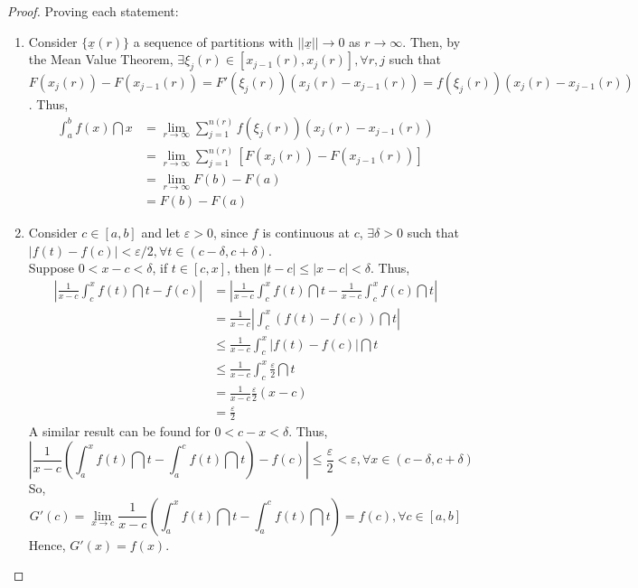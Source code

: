 \begin{proof}
    Proving each statement:
    \begin{enumerate}
        \item Consider $\{\underline{x}(r)\}$ a sequence of partitions with $||\underline{x}|| \to 0$ as $r \to \infty$. Then, by the Mean Value Theorem, $\exists \xi_j(r) \in [x_{j-1}(r), x_j(r)], \forall r, j$ such that $F(x_j(r)) - F(x_{j-1}(r)) = F'(\xi_j(r))(x_j(r) - x_{j-1}(r)) = f(\xi_j(r))(x_j(r) - x_{j-1}(r))$. Thus,
        \begin{align*}
            \int_a^b f(x) \dint x &= \lim \limits_{r \to \infty} \sum \limits_{j=1}^{n(r)} f(\xi_j(r))(x_j(r) - x_{j-1}(r)) \\
            &= \lim \limits_{r \to \infty} \sum \limits_{j=1}^{n(r)} [F(x_j(r)) - F(x_{j-1}(r))] \\
            &= \lim \limits_{r \to \infty} F(b) - F(a) \\
            &= F(b) - F(a)
        \end{align*}
        \item Consider $c \in [a,b]$ and let $\varepsilon > 0$, since $f$ is continuous at $c$, $\exists \delta > 0$ such that $|f(t) - f(c)| < \varepsilon/2, \forall t \in (c - \delta, c + \delta)$. \\
        Suppose $0 < x - c < \delta$, if $t \in [c,x]$, then $|t-c| \leq |x-c| < \delta$. Thus,
        \begin{align*}
            \left |
                \frac{1}{x-c} \int_c^x f(t) \dint t - f(c)
            \right | &= \left |
                \frac{1}{x-c} \int_c^x f(t) \dint t -  \frac{1}{x-c} \int_c^x f(c) \dint t
            \right | \\
            &= \frac{1}{x-c} \left |
                \int_c^x (f(t) - f(c)) \dint t
            \right | \\
            &\leq \frac{1}{x-c} \int_c^x |f(t) - f(c)| \dint t \\
            &\leq \frac{1}{x-c} \int_c^x \frac{\varepsilon}{2} \dint t \\
            &= \frac{1}{x-c}\frac{\varepsilon}{2}(x-c) \\
            &= \frac{\varepsilon}{2}
        \end{align*}
        A similar result can be found for $0 < c - x < \delta$. Thus,
        \begin{equation*}
            \left |
                \frac{1}{x-c} \left(\int_a^x f(t) \dint t - \int_a^c f(t) \dint t\right) - f(c)
            \right |
            \leq \frac{\varepsilon}{2}
            < \varepsilon, \forall x \in (c - \delta, c + \delta)
        \end{equation*}
        So,
        \begin{equation*}
            G'(c) = \lim \limits_{x \to c} \frac{1}{x-c} \left(\int_a^x f(t) \dint t - \int_a^c f(t) \dint t\right) = f(c), \forall c \in [a,b]
        \end{equation*}
        Hence, $G'(x) = f(x)$.
    \end{enumerate}
\end{proof}

